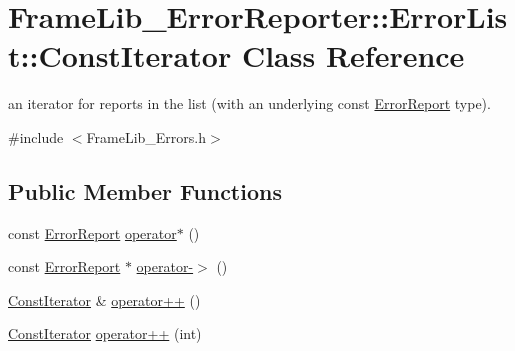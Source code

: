 \hypertarget{class_frame_lib___error_reporter_1_1_error_list_1_1_const_iterator}{}\section{Frame\+Lib\+\_\+\+Error\+Reporter\+:\+:Error\+List\+:\+:Const\+Iterator Class Reference}
\label{class_frame_lib___error_reporter_1_1_error_list_1_1_const_iterator}


an iterator for reports in the list (with an underlying const \hyperlink{class_frame_lib___error_reporter_1_1_error_report}{Error\+Report} type).  




{\ttfamily \#include $<$Frame\+Lib\+\_\+\+Errors.\+h$>$}

\subsection*{Public Member Functions}
\begin{DoxyCompactItemize}
\item 
const \hyperlink{class_frame_lib___error_reporter_1_1_error_report}{Error\+Report} \hyperlink{class_frame_lib___error_reporter_1_1_error_list_1_1_const_iterator_a3498bdd49ea2e1368fb811ac516d9e4c}{operator$\ast$} ()
\item 
const \hyperlink{class_frame_lib___error_reporter_1_1_error_report}{Error\+Report} $\ast$ \hyperlink{class_frame_lib___error_reporter_1_1_error_list_1_1_const_iterator_a08cbe6c95505991a964320a3075d558f}{operator-\/$>$} ()
\item 
\hyperlink{class_frame_lib___error_reporter_1_1_error_list_1_1_const_iterator}{Const\+Iterator} \& \hyperlink{class_frame_lib___error_reporter_1_1_error_list_1_1_const_iterator_a3b4e9c1094960458d77bac6efd3b4a06}{operator++} ()
\item 
\hyperlink{class_frame_lib___error_reporter_1_1_error_list_1_1_const_iterator}{Const\+Iterator} \hyperlink{class_frame_lib___error_reporter_1_1_error_list_1_1_const_iterator_af8f4652955ab5b278d6adbd2dead3fc4}{operator++} (int)
\end{DoxyCompactItemize}
